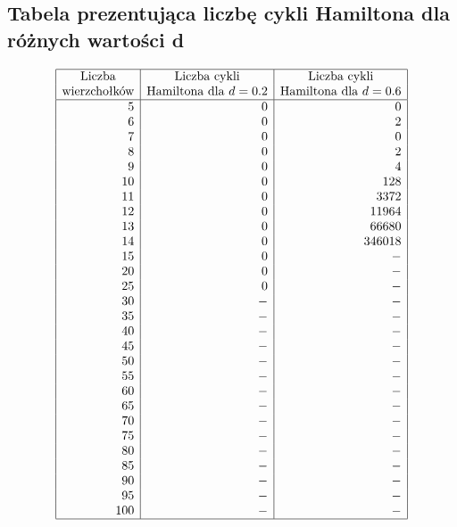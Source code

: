 \documentclass[polish,polish,a4paper]{article}
\begin{document}
\begin{spacing}{1.25}
\begin{spacing}{1.3}
	{\centering \subsection*{Tabela prezentująca liczbę cykli Hamiltona dla różnych wartości d}}
	\begin{equation*}
	\begin{array}{|r|r|r|}
	\hline
	\multicolumn{1}{|c|}{$Liczba$}&
	\multicolumn{1}{c|}{$Liczba cykli$}&
	\multicolumn{1}{c|}{$Liczba cykli$}\\
	\multicolumn{1}{|c|}{$wierzchołków$}&
	\multicolumn{1}{c|}{$Hamiltona dla $ d=0.2}&
	\multicolumn{1}{c|}{$Hamiltona dla $ d=0.6}\\
	\hline
	5&0&0\\
	6&0&2\\
	7&0&0\\
	8&0&2\\
	9&0&4\\
	10&0&128\\
	11&0&3372\\
	12&0&11964\\
	13&0&66680\\
	14&0&346018\\
	15&0&-\\
	20&0&-\\
	25&0&-\\
	30&-&-\\
	35&-&-\\
	40&-&-\\
	45&-&-\\
	50&-&-\\
	55&-&-\\
	60&-&-\\
	65&-&-\\
	70&-&-\\
	75&-&-\\
	80&-&-\\
	85&-&-\\
	90&-&-\\
	95&-&-\\
	100&-&-\\
	\hline
	\end{array}
	\end{equation*}
\end{spacing}

\end{spacing}
	\newpage
	\tableofcontents
\end{document}
